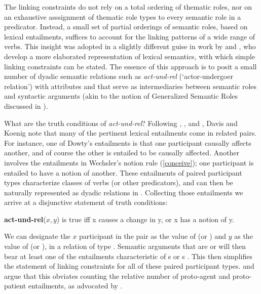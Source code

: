 \documentclass[output=paper]{langsci/langscibook}
\begin{document}
The linking constraints do not rely on a total ordering of thematic roles, nor on an exhaustive asssignment of thematic role types to every semantic role in a predicator. Instead, a small set of partial orderings of semantic roles, based on lexical entailments, suffices to account for the linking patterns of a wide range of verbs. 
This insight was adopted in a slightly different guise in work by \citet{Davis1996,Davis2001} and \cite{DavisandKoenig2000b}, who develop a more elaborated representation of lexical semantics, with which simple linking constraints can be stated.
The essence of this approach is to posit a small number of dyadic semantic relations such as \textit{act-und-rel} (`actor-undergoer relation') with attributes   and  that serve as intermediaries between semantic roles and syntactic arguments (akin to the notion of Generalized Semantic Roles discussed in \citealt{VanValin1999}).  

What are the truth conditions of \textit{act-und-rel}?  
Following \citet{Fillmore1977}, \citet{Dowty91a}, and \citet{Wechsler1995b}, Davis and Koenig note that many of the pertinent lexical entailments come in related pairs.
For instance, one of Dowty's entailments is that one participant causally affects another, and of course the other is entailed to be causally affected.
Another involves the entailments in Wechsler's notion rule (\ref{conceive}); one participant is entailed to have a notion of another. 
These entailments of paired participant types characterize classes of verbs (or other predicators), and can then be naturally represented as dyadic relations in .  Collecting those entailments we arrive at a disjunctive statement of truth conditions:

\begin{exe}
\ex \textbf{act-und-rel}($x,y$) is true iff x causes a change in y, or x has a notion of y.
\end{exe}

\noindent
We can designate the $x$ participant  in the pair as the value of  (or ) and $y$ as the value of  (or ), in a relation of type .   Semantic arguments that are  or  will then bear at least one of the entailments characteristic of s or s \citep[72]{DavisandKoenig2000b}. This then simplifies the statement of linking constraints for all of these paired participant types.
\citet{Davis1996} and \citet{KoenigandDavis2001} argue that this obviates counting the relative number of proto-agent and proto-patient entailments, as advocated by \citet{Dowty91a}.
\end{document}
